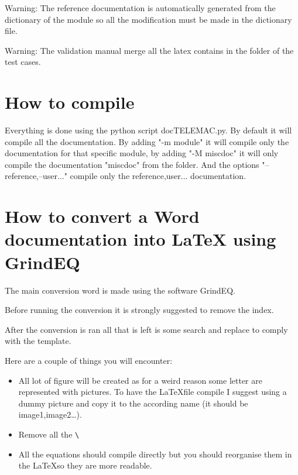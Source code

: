 \begin{WarningBlock}{Warning:}
The reference documentation is automatically generated from the dictionary of
the module so all the modification must be made in the dictionary file.
\end{WarningBlock}

\begin{WarningBlock}{Warning:}
The validation manual merge all the latex contains in the  folder
of the test cases.
\end{WarningBlock}

\section{How to compile}

Everything is done using the python script docTELEMAC.py. By default it will
compile all the documentation. By adding "-m module" it will compile only the
documentation for that specific module, by adding "-M miscdoc" it will only
compile the documentation "miscdoc" from the  folder. And the
options "--reference,--user..." compile only the reference,user...
documentation.

\section{How to convert a Word documentation into LaTeX using GrindEQ}

The main conversion word is made using the software GrindEQ.

Before running the conversion it is strongly suggested to remove the index.

After the conversion is ran all that is left is some search and replace to
comply with the template.

Here are a couple of things you will encounter:
\begin{itemize}
\item All lot of figure will be created as for a weird reason some letter are
represented with pictures. To have the \LaTeX file compile I suggest using a
dummy picture and copy it to the according name (it should be
image1,image2\ldots).
\item  Remove all the \verb!\!
\item All the equations should compile directly but you should reorganise them
in the \LaTeX so they are more readable.
\end{itemize}
